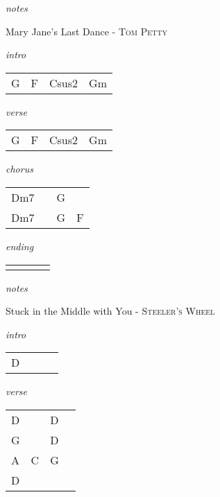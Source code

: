 \documentclass[12pt]{article}
\begin{document}
\textit{notes}

\newpage


{\Huge Mary Jane's Last Dance} {\huge - \textsc{Tom Petty}}

\huge
\textit{intro}

\begin{tabular}{|P{1.25in}|P{1.25in}|P{1.25in}|P{1.25in}|}
  G & F & Csus2  &  Gm \\
\end{tabular}

\textit{verse}

\begin{tabular}{|P{1.25in}|P{1.25in}|P{1.25in}|P{1.25in}|}
  G & F  &  Csus2 &  Gm \\
\end{tabular}

\textit{chorus}

\begin{tabular}{|P{1.25in}|P{1.25in}|P{1.25in}|P{1.25in}|}
  Dm7 &   & G  &   \\
  Dm7 &   & G  &  F \\

\end{tabular}

\textit{ending}

\begin{tabular}{|P{1.25in}|P{1.25in}|P{1.25in}|P{1.25in}|}
   &   &   &   \\
\end{tabular}

\textit{notes}

\newpage

{\Huge Stuck in the Middle with You} {\huge - \textsc{Steeler's Wheel}}

\huge
\textit{intro}

\begin{tabular}{|P{1.25in}|P{1.25in}|P{1.25in}|P{1.25in}|}
  D  &   &   &   \\
\end{tabular}

\textit{verse}

\begin{tabular}{|P{1.25in}|P{1.25in}|P{1.25in}|P{1.25in}|}
  D &   &  D &   \\
  G &   &  D &   \\
  A & C  &  G &  \\
  D &   &    &   \\
\end{tabular}
\end{document}
